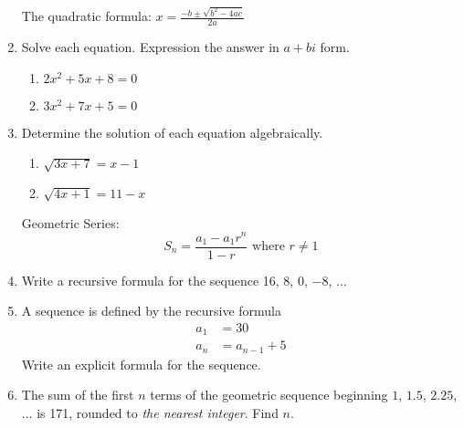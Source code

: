 \documentclass[12pt, twoside]{article}
\begin{document}
\begin{enumerate}[itemsep=0.5cm]
\newpage
The quadratic formula:
$\displaystyle x = \frac{-b \pm \sqrt{b^2-4ac}}{2a}$

\item Solve each equation. Expression the answer in $a+bi$ form.
    \begin{multicols}{2}
    \begin{enumerate}[itemsep=0.5cm]
        \item $2x^2+5x+8=0$
        \item $3x^2+7x+5=0$
    \end{enumerate}
    \end{multicols} \vspace{5cm}

\item Determine the solution of each equation algebraically.
    \begin{multicols}{2}
    \begin{enumerate}[itemsep=0.5cm]
        \item $\sqrt{3x+7}=x-1$ %
        \item $\sqrt{4x+1} = 11-x$ %
    \end{enumerate}
    \end{multicols}

\newpage
Geometric Series:
$$S_n = \frac{a_1 - a_1 r^n}{1-r} \text{ where } r \ne 1$$

\item Write a recursive formula for the sequence 16, 8, 0, $-8$, $\ldots$ \vspace{2cm}

\item A sequence is defined by the recursive formula
\begin{align*}
a_1 &= 30 \\
a_{n} &= a_{n-1}+5
\end{align*}
Write an explicit formula for the sequence. \vspace{2cm}


\item The sum of the first $n$ terms of the geometric sequence beginning $1$, $1.5$, $2.25$, $\ldots$ is 171, rounded to \emph{the nearest integer}. Find $n$. \vspace{2cm}


\end{enumerate}
\end{document}
